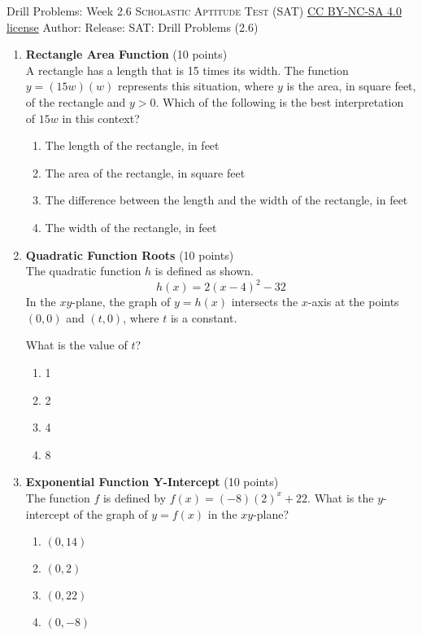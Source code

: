\newpage\handout
{Drill Problems: Week 2.6}
{\textsc{Scholastic Aptitude Test (SAT)}}
{\href{https://creativecommons.org/licenses/by-nc-sa/4.0/}{CC BY-NC-SA 4.0 license}}
{Author: \BookAuthor}{Release: \generatedOn}
{SAT: Drill Problems (2.6)}


\begin{enumerate}
  \item \textbf{Rectangle Area Function} (10 points)\\
  A rectangle has a length that is 15 times its width. The function $y=(15w)(w)$ represents this situation, where $y$ is the area, in square feet, of the rectangle and $y>0$. Which of the following is the best interpretation of $15w$ in this context?
  \begin{enumerate}[label=(\Alph*)]
    \item The length of the rectangle, in feet
    \item The area of the rectangle, in square feet
    \item The difference between the length and the width of the rectangle, in feet
    \item The width of the rectangle, in feet
  \end{enumerate}
  \begin{subanswer}
  \end{subanswer}

  \item \textbf{Quadratic Function Roots} (10 points)\\
  The quadratic function $h$ is defined as shown.
  \[
  h(x)=2(x-4)^{2}-32
  \]
  In the $xy$-plane, the graph of $y=h(x)$ intersects the $x$-axis at the points $(0,0)$ and $(t,0)$, where $t$ is a constant.
  
  What is the value of $t$?
  \begin{enumerate}[label=(\Alph*)]
    \item 1
    \item 2
    \item 4
    \item 8
  \end{enumerate}
  \begin{subanswer}
  \end{subanswer}

  \item \textbf{Exponential Function Y-Intercept} (10 points)\\
  The function $f$ is defined by $f(x)=(-8)(2)^{x}+22$. What is the $y$-intercept of the graph of $y=f(x)$ in the $xy$-plane?
  \begin{enumerate}[label=(\Alph*)]
    \item $(0,14)$
    \item $(0,2)$
    \item $(0,22)$
    \item $(0,-8)$
  \end{enumerate}
  \begin{subanswer}
  \end{subanswer}


\end{enumerate}
